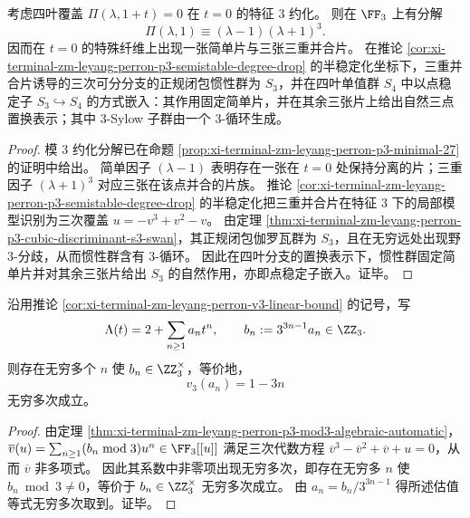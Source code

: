 \begin{theorem}\label{thm:xi-terminal-zm-leyang-perron-p3-inertia-point-stabilizer}
考虑四叶覆盖 \(\Pi(\lambda,1+t)=0\) 在 \(t=0\) 的特征 \(3\) 约化。
则在 \(\FF_3\) 上有分解
\[
\Pi(\lambda,1)\equiv (\lambda-1)(\lambda+1)^3.
\]
因而在 \(t=0\) 的特殊纤维上出现一张简单片与三张三重并合片。
在推论 \ref{cor:xi-terminal-zm-leyang-perron-p3-semistable-degree-drop} 的半稳定化坐标下，三重并合片诱导的三次可分分支的正规闭包惯性群为 \(S_3\)，并在四叶单值群 \(S_4\) 中以点稳定子 \(S_3\hookrightarrow S_4\) 的方式嵌入：其作用固定简单片，并在其余三张片上给出自然三点置换表示；其中 \(3\)-Sylow 子群由一个 \(3\)-循环生成。
\end{theorem}
\begin{proof}
模 \(3\) 约化分解已在命题 \ref{prop:xi-terminal-zm-leyang-perron-p3-minimal-27} 的证明中给出。
简单因子 \((\lambda-1)\) 表明存在一张在 \(t=0\) 处保持分离的片；三重因子 \((\lambda+1)^3\) 对应三张在该点并合的片族。
推论 \ref{cor:xi-terminal-zm-leyang-perron-p3-semistable-degree-drop} 的半稳定化把三重并合片在特征 \(3\) 下的局部模型识别为三次覆盖 \(u=-v^3+v^2-v\)。
由定理 \ref{thm:xi-terminal-zm-leyang-perron-p3-cubic-discriminant-s3-swan}，其正规闭包伽罗瓦群为 \(S_3\)，且在无穷远处出现野 \(3\)-分歧，从而惯性群含有 \(3\)-循环。
因此在四叶分支的置换表示下，惯性群固定简单片并对其余三张片给出 \(S_3\) 的自然作用，亦即点稳定子嵌入。证毕。
\end{proof}

\begin{corollary}\label{cor:xi-terminal-zm-leyang-perron-p3-slope-attained-infinitely-often}
沿用推论 \ref{cor:xi-terminal-zm-leyang-perron-v3-linear-bound} 的记号，写
\[
\Lambda(t)=2+\sum_{n\ge 1}a_n t^n,\qquad
b_n:=3^{3n-1}a_n\in\ZZ_3.
\]
则存在无穷多个 \(n\) 使 \(b_n\in\ZZ_3^\times\)，等价地，
\[
v_3(a_n)=1-3n
\]
无穷多次成立。
\end{corollary}
\begin{proof}
由定理 \ref{thm:xi-terminal-zm-leyang-perron-p3-mod3-algebraic-automatic}，\(\overline v(u)=\sum_{n\ge 1}(b_n\bmod 3)u^n\in\FF_3[[u]]\) 满足三次代数方程
\(
\overline v^3-\overline v^2+\overline v+u=0
\)，从而 \(\overline v\) 非多项式。
因此其系数中非零项出现无穷多次，即存在无穷多 \(n\) 使 \(b_n\bmod 3\neq 0\)，等价于 \(b_n\in\ZZ_3^\times\) 无穷多次成立。
由 \(a_n=b_n/3^{3n-1}\) 得所述估值等式无穷多次取到。证毕。
\end{proof}

\endinput

